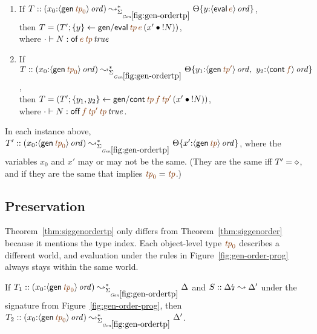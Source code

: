 \bigskip
\begin{lemma}~
\begin{enumerate}
\item If 
   $T :: (x_0{:}\istrue{\susp{{\sf gen}\,\lf{{\it tp}_0}}}) 
         \leadsto^*_{\siggenordertp}
         \tackon{\Theta}{y{:}\istrue{\susp{{\sf eval}\,\lf{e}}}}$,
\\ then 
   $T = \left(T'; \trstep{y}{{\sf gen/eval}\,\lf{{\it tp}}\,\lf{e}\,(\tfuser{x'}{\tbangr{N}})}\right)$,
\\ where $\cdot \vdash N : \isconc{{\sf of}\,\lf{e}\,\lf{{\it tp}}}$
\medskip
\item If 
   $T :: (x_0{:}\istrue{\susp{{\sf gen}\,\lf{{\it tp}_0}}})
         \leadsto^*_{\siggenordertp}
         \tackon{\Theta}{y_1{:}\istrue{\susp{{\sf gen}\,\lf{{\it tp}'}}}, ~
                         y_2{:}\istrue{\susp{{\sf cont}\,\lf{f}}}}$,
\\ then 
   $T = \left(T'; \trstep{y_1,y_2}{{\sf gen/cont}\,\lf{{\it tp}}\,\lf{f}\,\lf{{\it tp}'}\,(\tfuser{x'}{\tbangr{N}})}\right)$,
\\ where 
   $\cdot \vdash N : \isconc{{{{\sf off}\,\lf{f}\,\lf{{\it tp}'}\,\lf{{\it tp}}}}}$.
\medskip
\end{enumerate}
In each instance above, 
$T' :: (x_0{:}\istrue{\susp{{\sf gen}\,\lf{{\it tp}_0}}}) \leadsto^*_{\siggenordertp}
          \tackon{\Theta}{x'{:}\istrue{\susp{{\sf gen}\,\lf{{\it tp}}}}}$,
where the variables $x_0$ and $x'$ may or may not
be the same. (They are the same iff $T' = \diamond$, and if they
are the same that implies $\lf{{\it tp}_0} = \lf{{\it tp}}$.)
\end{lemma}
\bigskip



\subsection{Preservation}


Theorem~\ref{thm:siggenordertp} only differs from
Theorem~\ref{thm:siggenorder} because it mentions the type index.
Each object-level type $\lf{{\it tp}_0}$ describes a different world,
and evaluation under the rules in Figure~\ref{fig:gen-order-prog}
always stays within the same world.

\bigskip
\begin{theorem}
\label{thm:siggenordertp}
If $T_1 :: (x_0{:}\istrue{\susp{{\sf gen}\,\lf{{\it tp}_0}}}) \leadsto^*_{\siggenordertp} 
   \Delta$ and $S :: {\Delta}{\mbox{\lightning}}_{} \leadsto \Delta'$
under the signature from Figure~\ref{fig:gen-order-prog}, then
$T_2 :: (x_0{:}\istrue{\susp{{\sf gen}\,\lf{{\it tp}_0}}}) \leadsto^*_{\siggenordertp} 
   \Delta'$.
\end{theorem}

